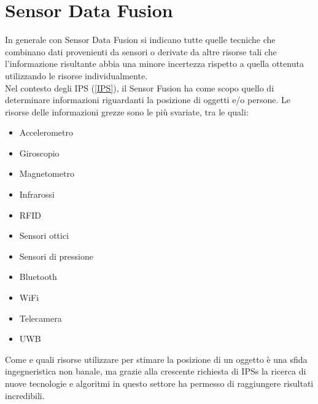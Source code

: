 \section{Sensor Data Fusion}

In generale con Sensor Data Fusion si indicano tutte quelle tecniche che \cite{sensorfusion} combinano dati provenienti da sensori o derivate da altre risorse tali che l'informazione risultante abbia una minore incertezza rispetto a quella ottenuta utilizzando le risorse individualmente. \\
Nel contesto degli IPS (\ref{IPS}), il Sensor Fusion ha come scopo quello di determinare informazioni riguardanti la posizione di oggetti e/o persone. Le risorse delle informazioni grezze sono le più svariate, tra le quali:
\begin{itemize}
	\item Accelerometro
	\item Giroscopio
	\item Magnetometro
	\item Infrarossi
	\item RFID 
	\item Sensori ottici
	\item Sensori di pressione
	\item Bluetooth
	\item WiFi
	\item Telecamera
	\item UWB
\end{itemize}

Come e quali risorse utilizzare per stimare la posizione di un oggetto è una sfida ingegneristica non banale, ma grazie alla crescente richiesta di IPSs la ricerca di nuove tecnologie e algoritmi in questo settore ha permesso di raggiungere risultati incredibili. \\







